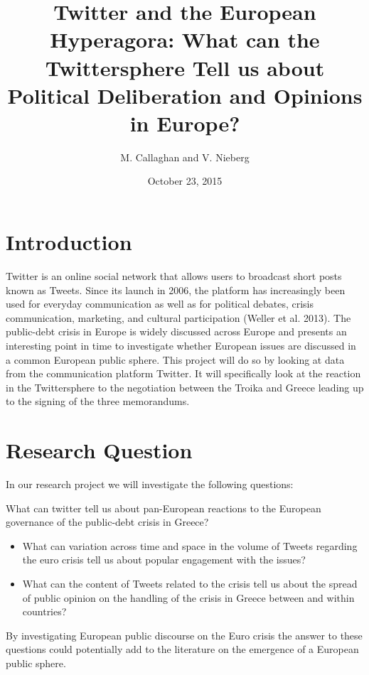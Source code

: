 \documentclass[]{article}
\title{Twitter and the European Hyperagora: What can the Twittersphere Tell us
about Political Deliberation and Opinions in Europe?}
\author{M. Callaghan and V. Nieberg}
\date{October 23, 2015}
\begin{document}
\maketitle


{
\hypersetup{linkcolor=black}
\setcounter{tocdepth}{2}
\tableofcontents
}
\newpage

\section{Introduction}\label{introduction}

Twitter is an online social network that allows users to broadcast short
posts known as Tweets. Since its launch in 2006, the platform has
increasingly been used for everyday communication as well as for
political debates, crisis communication, marketing, and cultural
participation (Weller et al. 2013). The public-debt crisis in Europe is
widely discussed across Europe and presents an interesting point in time
to investigate whether European issues are discussed in a common
European public sphere. This project will do so by looking at data from
the communication platform Twitter. It will specifically look at the
reaction in the Twittersphere to the negotiation between the Troika and
Greece leading up to the signing of the three memorandums.

\section{Research Question}\label{research-question}

In our research project we will investigate the following questions:

What can twitter tell us about pan-European reactions to the European
governance of the public-debt crisis in Greece?

\begin{itemize}
\item
  What can variation across time and space in the volume of Tweets
  regarding the euro crisis tell us about popular engagement with the
  issues?
\item
  What can the content of Tweets related to the crisis tell us about the
  spread of public opinion on the handling of the crisis in Greece
  between and within countries?
\end{itemize}

By investigating European public discourse on the Euro crisis the answer
to these questions could potentially add to the literature on the
emergence of a European public sphere.
\end{document}
